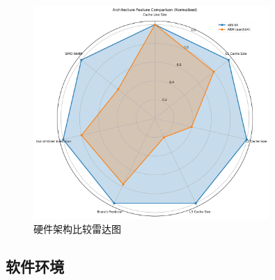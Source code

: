 \documentclass[a4paper,colorlinks=true,linkcolor=blue,urlcolor=blue,citecolor=green,bookmarks=true]{article}
\begin{document}
\begin{figure}[htbp]
  \centering
  \includegraphics[width=0.8\textwidth]{architecture_comparison.png}
  \caption{硬件架构比较雷达图}
  \label{fig:hardware_config}
\end{figure}

\subsection{软件环境}
\end{document}
